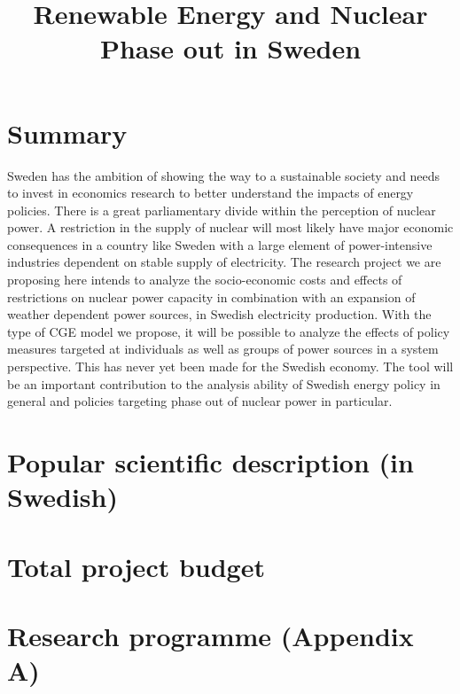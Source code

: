\documentclass[10pt,a4paper]{article}
\begin{document}
\title{Renewable Energy and Nuclear Phase out in Sweden}
\date{}
\author{}
\maketitle

\section{Summary}
Sweden has the ambition of showing the way to a sustainable society and needs to invest in economics research to better understand the impacts of energy policies. There is a great parliamentary divide within the perception of nuclear power. A restriction in the supply of nuclear will most likely have major economic consequences in a country like Sweden with a large element of power-intensive industries dependent on stable supply of electricity. The research project we are proposing here intends to analyze the socio-economic costs and effects of restrictions on nuclear power capacity in combination with an expansion of weather dependent power sources, in Swedish electricity production. With the type of CGE model we propose, it will be possible to analyze the effects of policy measures targeted at individuals as well as groups of power sources in a system perspective. This has never yet been made for the Swedish economy. The tool will be an important contribution to the analysis ability of Swedish energy policy in general and policies targeting phase out of nuclear power in particular.
\section{Popular scientific description (in Swedish)}
\section{Total project budget}

\section{Research programme (Appendix A)}
\end{document}
